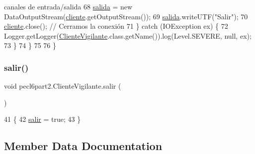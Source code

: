 \begin{DoxyCode}
{       canales de entrada/salida}
68                 \mbox{\hyperlink{classpecl6part2_1_1_cliente_vigilante_a2ae49bc25f90bbe7af39d0e8886345d3}{salida}} = \textcolor{keyword}{new} DataOutputStream(\mbox{\hyperlink{classpecl6part2_1_1_cliente_vigilante_a86ec03929e1c3324e42f83c4b49d0273}{cliente}}.getOutputStream());
69                 \mbox{\hyperlink{classpecl6part2_1_1_cliente_vigilante_a2ae49bc25f90bbe7af39d0e8886345d3}{salida}}.writeUTF(\textcolor{stringliteral}{"Salir"});    
70                 \mbox{\hyperlink{classpecl6part2_1_1_cliente_vigilante_a86ec03929e1c3324e42f83c4b49d0273}{cliente}}.close();                                          \textcolor{comment}{// Cerramos la conexión}
71             \} \textcolor{keywordflow}{catch} (IOException ex) \{
72                 Logger.getLogger(\mbox{\hyperlink{classpecl6part2_1_1_cliente_vigilante_a2ba9f0dd667c95448bbbf3fe0cfccfcf}{ClienteVigilante}}.class.getName()).log(Level.SEVERE, null, 
      ex);
73             \}
74             \}
75         
76     \}
\end{DoxyCode}
\mbox{\label{classpecl6part2_1_1_cliente_vigilante_a79eb08097bb28efa5c33a168babe47e8}} 
\subsubsection{\texorpdfstring{salir()}{salir()}}
{\footnotesize\ttfamily void pecl6part2.\+Cliente\+Vigilante.\+salir (\begin{DoxyParamCaption}{ }\end{DoxyParamCaption})\hspace{0.3cm}{\ttfamily [inline]}}


\begin{DoxyCode}
41     \{
42         \mbox{\hyperlink{classpecl6part2_1_1_cliente_vigilante_a79eb08097bb28efa5c33a168babe47e8}{salir}} = \textcolor{keyword}{true};
43     \}
\end{DoxyCode}


\subsection{Member Data Documentation}
\mbox{\label{classpecl6part2_1_1_cliente_vigilante_a86ec03929e1c3324e42f83c4b49d0273}} 
